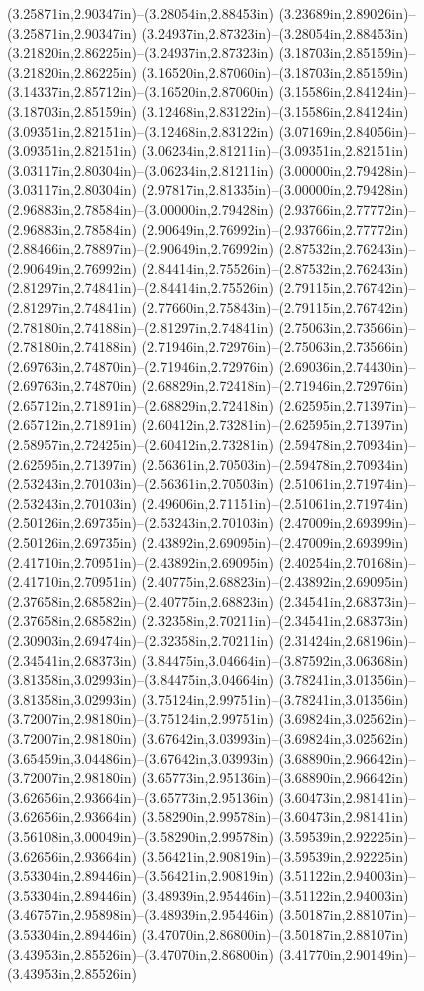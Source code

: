 (3.25871in,2.90347in)--(3.28054in,2.88453in) (3.23689in,2.89026in)--(3.25871in,2.90347in) (3.24937in,2.87323in)--(3.28054in,2.88453in) (3.21820in,2.86225in)--(3.24937in,2.87323in) (3.18703in,2.85159in)--(3.21820in,2.86225in) (3.16520in,2.87060in)--(3.18703in,2.85159in) (3.14337in,2.85712in)--(3.16520in,2.87060in) (3.15586in,2.84124in)--(3.18703in,2.85159in) (3.12468in,2.83122in)--(3.15586in,2.84124in) (3.09351in,2.82151in)--(3.12468in,2.83122in) (3.07169in,2.84056in)--(3.09351in,2.82151in) (3.06234in,2.81211in)--(3.09351in,2.82151in) (3.03117in,2.80304in)--(3.06234in,2.81211in) (3.00000in,2.79428in)--(3.03117in,2.80304in) (2.97817in,2.81335in)--(3.00000in,2.79428in) (2.96883in,2.78584in)--(3.00000in,2.79428in) (2.93766in,2.77772in)--(2.96883in,2.78584in) (2.90649in,2.76992in)--(2.93766in,2.77772in) (2.88466in,2.78897in)--(2.90649in,2.76992in) (2.87532in,2.76243in)--(2.90649in,2.76992in) (2.84414in,2.75526in)--(2.87532in,2.76243in) (2.81297in,2.74841in)--(2.84414in,2.75526in) (2.79115in,2.76742in)--(2.81297in,2.74841in) (2.77660in,2.75843in)--(2.79115in,2.76742in) (2.78180in,2.74188in)--(2.81297in,2.74841in) (2.75063in,2.73566in)--(2.78180in,2.74188in) (2.71946in,2.72976in)--(2.75063in,2.73566in) (2.69763in,2.74870in)--(2.71946in,2.72976in) (2.69036in,2.74430in)--(2.69763in,2.74870in) (2.68829in,2.72418in)--(2.71946in,2.72976in) (2.65712in,2.71891in)--(2.68829in,2.72418in) (2.62595in,2.71397in)--(2.65712in,2.71891in) (2.60412in,2.73281in)--(2.62595in,2.71397in) (2.58957in,2.72425in)--(2.60412in,2.73281in) (2.59478in,2.70934in)--(2.62595in,2.71397in) (2.56361in,2.70503in)--(2.59478in,2.70934in) (2.53243in,2.70103in)--(2.56361in,2.70503in) (2.51061in,2.71974in)--(2.53243in,2.70103in) (2.49606in,2.71151in)--(2.51061in,2.71974in) (2.50126in,2.69735in)--(2.53243in,2.70103in) (2.47009in,2.69399in)--(2.50126in,2.69735in) (2.43892in,2.69095in)--(2.47009in,2.69399in) (2.41710in,2.70951in)--(2.43892in,2.69095in) (2.40254in,2.70168in)--(2.41710in,2.70951in) (2.40775in,2.68823in)--(2.43892in,2.69095in) (2.37658in,2.68582in)--(2.40775in,2.68823in) (2.34541in,2.68373in)--(2.37658in,2.68582in) (2.32358in,2.70211in)--(2.34541in,2.68373in) (2.30903in,2.69474in)--(2.32358in,2.70211in) (2.31424in,2.68196in)--(2.34541in,2.68373in) (3.84475in,3.04664in)--(3.87592in,3.06368in) (3.81358in,3.02993in)--(3.84475in,3.04664in) (3.78241in,3.01356in)--(3.81358in,3.02993in) (3.75124in,2.99751in)--(3.78241in,3.01356in) (3.72007in,2.98180in)--(3.75124in,2.99751in) (3.69824in,3.02562in)--(3.72007in,2.98180in) (3.67642in,3.03993in)--(3.69824in,3.02562in) (3.65459in,3.04486in)--(3.67642in,3.03993in) (3.68890in,2.96642in)--(3.72007in,2.98180in) (3.65773in,2.95136in)--(3.68890in,2.96642in) (3.62656in,2.93664in)--(3.65773in,2.95136in) (3.60473in,2.98141in)--(3.62656in,2.93664in) (3.58290in,2.99578in)--(3.60473in,2.98141in) (3.56108in,3.00049in)--(3.58290in,2.99578in) (3.59539in,2.92225in)--(3.62656in,2.93664in) (3.56421in,2.90819in)--(3.59539in,2.92225in) (3.53304in,2.89446in)--(3.56421in,2.90819in) (3.51122in,2.94003in)--(3.53304in,2.89446in) (3.48939in,2.95446in)--(3.51122in,2.94003in) (3.46757in,2.95898in)--(3.48939in,2.95446in) (3.50187in,2.88107in)--(3.53304in,2.89446in) (3.47070in,2.86800in)--(3.50187in,2.88107in) (3.43953in,2.85526in)--(3.47070in,2.86800in) (3.41770in,2.90149in)--(3.43953in,2.85526in) 